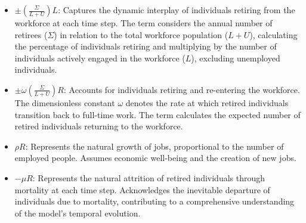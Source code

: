 \documentclass[11pt]{amsart}
\begin{document}
    


\begin{itemize}
    \item $\pm\left(\frac{\Sigma}{L + U}\right) L$: Captures the dynamic interplay of individuals retiring from the workforce at each time step. The term considers the annual number of retirees ($\Sigma$) in relation to the total workforce population ($L + U$), calculating the percentage of individuals retiring and multiplying by the number of individuals actively engaged in the workforce ($L$), excluding unemployed individuals.

    \item $\pm \omega\left(\frac{\Sigma}{L + U}\right) R$: Accounts for individuals retiring and re-entering the workforce. The dimensionless constant $\omega$ denotes the rate at which retired individuals transition back to full-time work. The term calculates the expected number of retired individuals returning to the workforce.

    \item $\rho R$: Represents the natural growth of jobs, proportional to the number of employed people. Assumes economic well-being and the creation of new jobs.

    \item $-\mu R$: Represents the natural attrition of retired individuals through mortality at each time step. Acknowledges the inevitable departure of individuals due to mortality, contributing to a comprehensive understanding of the model's temporal evolution.
\end{itemize}
\end{document}
